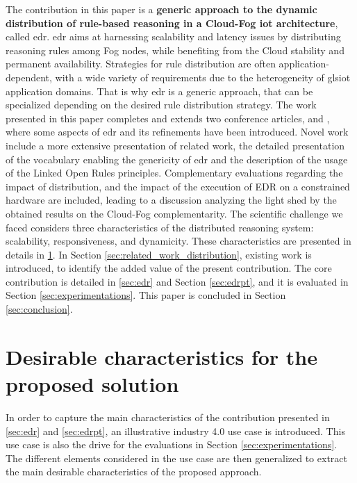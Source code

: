 \documentclass{iosart2c}
\newcommand{\edr}{EDR\xspace}
\newcommand{\Khalil}[1]{\textcolor{red}{ Khalil: \textbf{#1} }}
\begin{document}
The contribution in this paper is a \textbf{generic approach to the dynamic distribution of rule-based reasoning in a Cloud-Fog \gls{iot} architecture}, called \gls{edr}.
\gls{edr} aims at harnessing scalability and latency issues by distributing reasoning rules among Fog nodes, while benefiting from the Cloud stability and permanent availability. 
Strategies for rule distribution are often application-dependent, with a wide variety of requirements due to the heterogeneity of gls{iot} application domains.
That is why \gls{edr} is a generic approach, that can be specialized depending on the desired rule distribution strategy.
The work presented in this paper completes and extends two conference articles, \cite{wi2018} and \cite{coopis2018}, where some aspects of \gls{edr} and its refinements have been introduced.
Novel work include a more extensive presentation of related work, the detailed presentation of the vocabulary enabling the genericity of \gls{edr} and the description of the usage of the Linked Open Rules \cite{Khandelwal2011} principles. 
Complementary evaluations regarding the impact of distribution, and the impact of the execution of \edr on a constrained hardware are included, leading to a discussion analyzing the light shed by the obtained results on the Cloud-Fog complementarity. 
The scientific challenge we faced considers three characteristics of the distributed reasoning system: scalability, responsiveness, and dynamicity. 
These characteristics are presented in details in \textsection \ref{sec:edr_characteristics}.
In Section \textsection \ref{sec:related_work_distribution}, existing work is introduced, to identify the added value of the present contribution.
The core contribution is detailed in \textsection \ref{sec:edr} and Section \textsection \ref{sec:edrpt}, and it is evaluated in Section \textsection \ref{sec:experimentations}.
This paper is concluded in Section \textsection \ref{sec:conclusion}.

\section{Desirable characteristics for the proposed solution}
\label{sec:edr_characteristics}

In order to capture the main characteristics of the contribution presented in \textsection \ref{sec:edr} and \textsection \ref{sec:edrpt}, an illustrative industry 4.0 use case is introduced. 
This use case is also the drive for the evaluations in Section \textsection \ref{sec:experimentations}.
The different elements considered in the use case are then generalized to extract the main desirable characteristics of the proposed approach.
\end{document}
